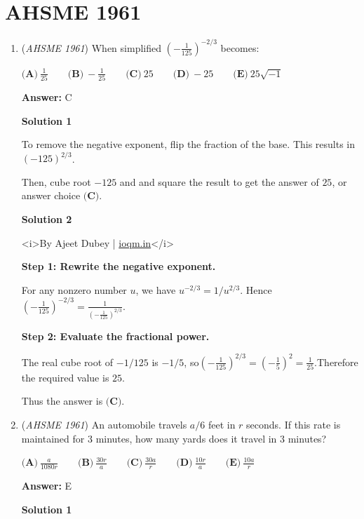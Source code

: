 \section{AHSME 1961}
        \begin{enumerate}
        	\item (\textit{AHSME 1961}) When simplified $(-\frac{1}{125})^{-2/3}$ becomes:


 $\textbf{(A)}\ \frac{1}{25} \qquad \textbf{(B)}\ -\frac{1}{25} \qquad \textbf{(C)}\ 25\qquad \textbf{(D)}\ -25\qquad \textbf{(E)}\ 25\sqrt{-1}$

 \textbf{Answer: }C



\textbf{Solution 1}

To remove the negative exponent, flip the fraction of the base.  This results in $(-125)^{2/3}$.

 Then, cube root $-125$ and and square the result to get the answer of $25$, or answer choice $\boxed{\textbf{(C)}}$.

 



\textbf{Solution 2}

<i>By Ajeet Dubey | \href{https://ioqm.in}{ioqm.in}</i>

 \textbf{Step 1: Rewrite the negative exponent.}

 For any nonzero number $u$, we have $u^{-2/3}=1/u^{2/3}$. Hence$\left(-\frac1{125}\right)^{-2/3}=\frac{1}{\left(-\frac1{125}\right)^{2/3}}.$

 \textbf{Step 2: Evaluate the fractional power.}

 The real cube root of $-1/125$ is $-1/5$, so$\left(-\frac1{125}\right)^{2/3}=\left(-\frac15\right)^2=\frac1{25}.$Therefore the required value is $25$.

 Thus the answer is $\boxed{\textbf{(C)}}$.

 


	\item (\textit{AHSME 1961}) An automobile travels $a/6$ feet in $r$ seconds. If this rate is maintained for $3$ minutes, how many yards does it travel in $3$ minutes?


 $\textbf{(A)}\ \frac{a}{1080r}\qquad \textbf{(B)}\ \frac{30r}{a}\qquad \textbf{(C)}\ \frac{30a}{r}\qquad \textbf{(D)}\ \frac{10r}{a}\qquad \textbf{(E)}\ \frac{10a}{r}$

 \textbf{Answer: }E



\textbf{Solution 1}


\end{enumerate}
